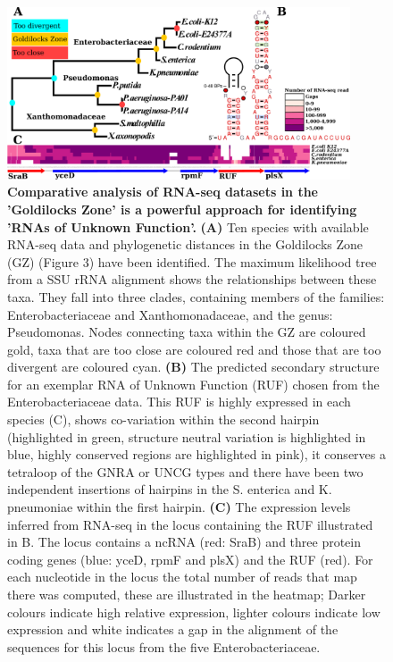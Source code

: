 \documentclass[10pt]{article}
\begin{document}
\begin{figure}[!ht]
\begin{center}
\includegraphics[width=4in]{figures/figure4.pdf}
\end{center}
\caption{ {\bf Comparative analysis of RNA-seq datasets in the
    'Goldilocks Zone' is a powerful approach for identifying 'RNAs of
    Unknown Function'.} {\bf (A)} Ten species with available RNA-seq data
  and phylogenetic distances in the Goldilocks Zone (GZ) (Figure 3)
  have been identified. The maximum likelihood tree from a SSU rRNA
  alignment shows the relationships between these taxa. They fall into
  three clades, containing members of the families: Enterobacteriaceae
  and Xanthomonadaceae, and the genus: Pseudomonas. Nodes connecting
  taxa within the GZ are coloured gold, taxa that are too close are
  coloured red and those that are too divergent are coloured cyan. {\bf (B)}
  The predicted secondary structure for an exemplar RNA of Unknown
  Function (RUF) chosen from the Enterobacteriaceae data. This RUF is
  highly expressed in each species (C), shows co-variation within the
  second hairpin (highlighted in green, structure neutral variation is
  highlighted in blue, highly conserved regions are highlighted in
  pink), it conserves a tetraloop of the GNRA or UNCG types and there
  have been two independent insertions of hairpins in the S. enterica
  and K. pneumoniae within the first hairpin. {\bf (C)} The expression
  levels inferred from RNA-seq in the locus containing the RUF
  illustrated in B. The locus contains a ncRNA (red: SraB) and three
  protein coding genes (blue: yceD, rpmF and plsX) and the RUF
  (red). For each nucleotide in the locus the total number of reads
  that map there was computed, these are illustrated in the heatmap;
  Darker colours indicate high relative expression, lighter colours
  indicate low expression and white indicates a gap in the alignment
  of the sequences for this locus from the five Enterobacteriaceae.}
\label{fig:4}
\end{figure}



\end{document}
